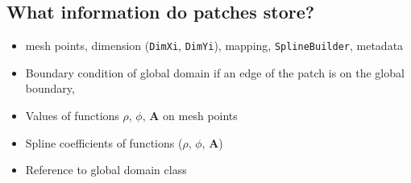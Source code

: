 \documentclass[presentation.tex]{subfiles}
\begin{document}
\subsection{What information do patches store?}
\begin{itemize}
    \item mesh points, dimension (\texttt{DimXi}, \texttt{DimYi}), mapping,
            \texttt{SplineBuilder}, metadata
    \item Boundary condition of global domain if an edge of the patch is on the global boundary,
    \item Values of functions $\rho$, $\phi$, $\mathbf{A}$ on mesh points
    \item Spline coefficients of functions ($\rho$, $\phi$, $\mathbf{A}$)
    \item Reference to global domain class
\end{itemize}
\end{document}
